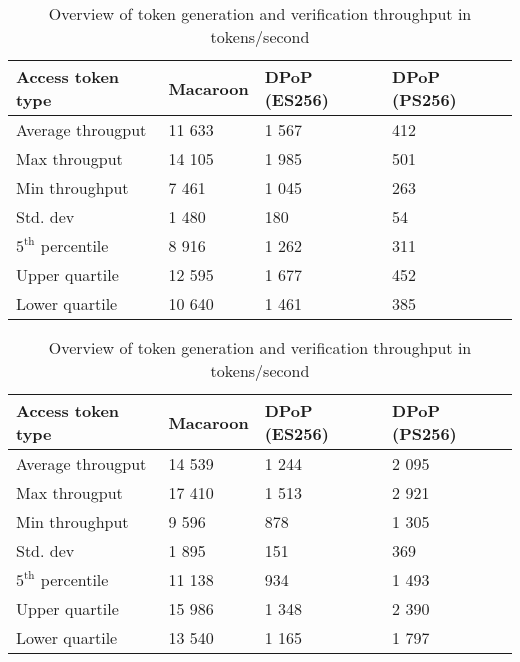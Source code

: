\begin{table}[H]
\begin{subtable}{1.0\textwidth}
\centering
\begin{tabular}{llll}
\textbf{Access token type} & \textbf{Macaroon} & \textbf{DPoP (ES256)} & \textbf{DPoP (PS256)} \\ \hline
Average througput          & 11 633          & 1 567               & 412                \\
Max througput              & 14 105             & 1 985                  & 501                   \\
Min throughput             & 7 461              & 1 045                  & 263                   \\
Std. dev                   & 1 480           & 180                & 54                \\
$5^{\text{th}}$ percentile            & 8 916         & 1 262            & 311                 \\
Upper quartile             & 12 595          & 1 677              & 452                \\
Lower quartile             & 10 640             & 1 461               & 385                
\end{tabular}
\caption{Token generation throughput}
\label{table:token-gen-throughput}
\end{subtable}

\vspace*{0.5 cm}

\begin{subtable}{1.0\textwidth}
\centering
\begin{tabular}{llll}
\textbf{Access token type} & \textbf{Macaroon} & \textbf{DPoP (ES256)} & \textbf{DPoP (PS256)} \\ \hline
Average througput          & 14 539             & 1 244               & 2 095               \\
Max througput              & 17 410             & 1 513               & 2 921                  \\
Min throughput             & 9 596              & 878                 & 1 305                  \\
Std. dev                   & 1 895              & 151                 & 369                \\
$5^{\text{th}}$ percentile             & 11 138             & 934                 & 1 493                \\
Upper quartile             & 15 986             & 1 348               & 2 390                \\
Lower quartile             & 13 540             & 1 165               & 1 797                 
\end{tabular}
\caption{Token verification throughput}
\label{table:token-ver-throughput}
\end{subtable}

\caption{Overview of token generation and verification throughput in tokens/second}
\label{table:token-througput}

\end{table}